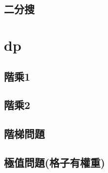     \subsection{二分搜}
        
\section{dp}
    \subsection{階乘1}
        
    \subsection{階乘2}
        
    \subsection{階梯問題}
        
     \subsection{極值問題(格子有權重)}
        
